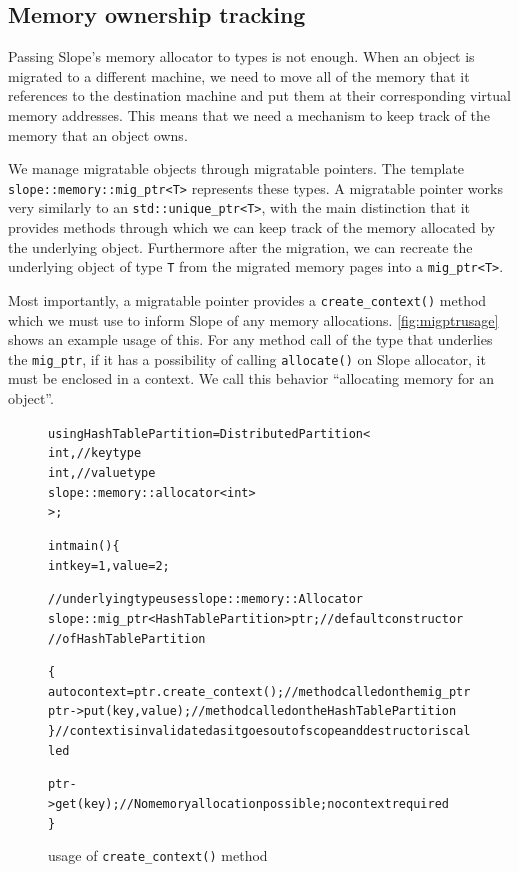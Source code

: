 \subsection{Memory ownership tracking}
Passing Slope's memory allocator to types is not enough.
When an object is migrated to a different machine, we need to move all of the
memory that it references to the destination machine and put them at their
corresponding virtual memory addresses. This means
that we need a mechanism to keep track of the memory that an object owns.

We manage migratable objects through migratable pointers. The template\\
\texttt{slope::memory::mig\_ptr<T>} represents these types. A migratable
pointer works very similarly to an \texttt{std::unique\_ptr<T>}, with the
main distinction that it provides methods through which we can keep track
of the memory allocated by the underlying object. Furthermore after the
migration, we can recreate the underlying object of type \texttt{T} from
the migrated memory pages into a \texttt{mig\_ptr<T>}.

Most importantly, a migratable pointer provides a \texttt{create\_context()}
method which we must use to inform Slope of any memory allocations.
\autoref{fig:migptrusage} shows an example usage of this. For any method call
of the type that underlies the \texttt{mig\_ptr},
if it has a possibility of calling \texttt{allocate()} on Slope allocator, it
must be enclosed in a context. We call this behavior ``allocating memory for
an object''.

\begin{figure}[tp]
\begin{alltt}

using HashTablePartition = DistributedPartition<
    int, // key type
    int, // value type
    slope::memory::allocator<int>
    >;

int main() \{
  int key = 1, value = 2;

  // underlying type uses slope::memory::Allocator
    slope::mig_ptr<HashTablePartition> ptr{}; // default constructor
                                            // of HashTablePartition

  \{
    auto context = ptr.create_context(); // method called on the mig_ptr
    ptr->put(key, value); // method called on the HashTablePartition
  \} // context is invalidated as it goes out of scope and destructor is called

  ptr->get(key); // No memory allocation possible; no context required
\}
\end{alltt}
\caption{
    usage of \texttt{create\_context()} method
}
\label{fig:migptrusage}
\end{figure}


